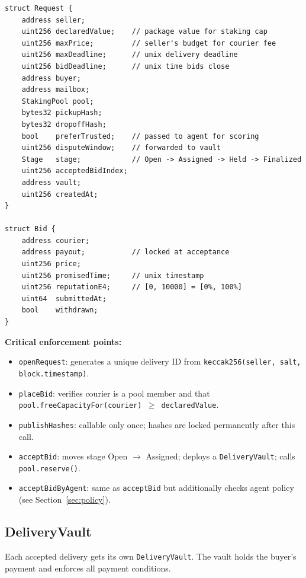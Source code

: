 \documentclass[12pt,a4paper]{article}
\begin{document}
\begin{lstlisting}[language=Solidity, caption=Request and Bid structs in MarketplaceRegistry.sol]
struct Request {
    address seller;
    uint256 declaredValue;    // package value for staking cap
    uint256 maxPrice;         // seller's budget for courier fee
    uint256 maxDeadline;      // unix delivery deadline
    uint256 bidDeadline;      // unix time bids close
    address buyer;
    address mailbox;
    StakingPool pool;
    bytes32 pickupHash;
    bytes32 dropoffHash;
    bool    preferTrusted;    // passed to agent for scoring
    uint256 disputeWindow;    // forwarded to vault
    Stage   stage;            // Open -> Assigned -> Held -> Finalized
    uint256 acceptedBidIndex;
    address vault;
    uint256 createdAt;
}

struct Bid {
    address courier;
    address payout;           // locked at acceptance
    uint256 price;
    uint256 promisedTime;     // unix timestamp
    uint256 reputationE4;     // [0, 10000] = [0%, 100%]
    uint64  submittedAt;
    bool    withdrawn;
}
\end{lstlisting}

\textbf{Critical enforcement points:}

\begin{itemize}
    \item \texttt{openRequest}: generates a unique delivery ID from \texttt{keccak256(seller, salt, block.timestamp)}.
    \item \texttt{placeBid}: verifies courier is a pool member and that \texttt{pool.freeCapacityFor(courier) $\geq$ declaredValue}.
    \item \texttt{publishHashes}: callable only once; hashes are locked permanently after this call.
    \item \texttt{acceptBid}: moves stage Open $\to$ Assigned; deploys a \texttt{DeliveryVault}; calls \texttt{pool.reserve()}.
    \item \texttt{acceptBidByAgent}: same as \texttt{acceptBid} but additionally checks agent policy (see Section~\ref{sec:policy}).
\end{itemize}

\subsection{DeliveryVault}

Each accepted delivery gets its own \texttt{DeliveryVault}. The vault holds the buyer's payment and enforces all payment conditions.
\end{document}
